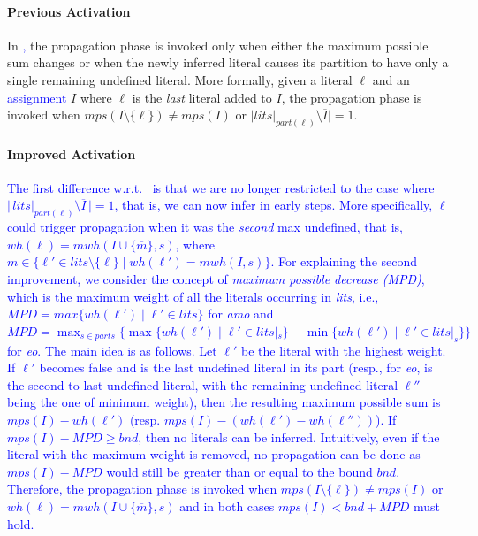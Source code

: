 \documentclass[preprint,authoryear]{elsarticle}
\newcommand{\lits}{\mathit{lits}}
\newcommand{\mwh}{\mathit{mwh}}
\newcommand{\wh}{\mathit{wh}}
\newcommand{\mps}{\mathit{mps}}
\newcommand{\parts}{\mathit{parts}}
\newcommand{\bnd}{\mathit{bnd}}
\theoremstyle{definition}
\begin{document}
\paragraph{Previous Activation}
In \textcolor{blue}{\cite{DBLP:conf/ijcai/AlvianoDFM24},} the propagation phase is invoked only when either the maximum possible sum changes or when the newly inferred literal causes its partition to have only a single remaining undefined literal.
More formally, given a literal $\ell$ and an \textcolor{blue}{assignment} $I$ where $\ell$ is the \textit{last} literal added to $I$, the propagation phase is invoked when $\mps(I \setminus \{\ell\}) \neq \mps(I)$ or $|\lits|_{\mathit{part}(\ell)} \setminus \overline{I}| = 1$.

\paragraph{Improved Activation}
\textcolor{blue}{
The first difference w.r.t.~\citep{DBLP:conf/ijcai/AlvianoDFM24} is that we are no longer restricted to the case where $\vert\,\lits|_{\mathit{part}(\ell)} \setminus \overline{I}\, \vert = 1$, that is, we can now infer in early steps.
More specifically, $\ell$ could trigger propagation when it was the \textit{second} max undefined, that is, $\wh(\ell) = \mwh(I \cup \{\overline{m}\}, s)$, where $m \in \{\ell' \in \lits \setminus \{\ell\} \mid \wh(\ell') = \mwh(I,s)\}.$ 
For explaining the second improvement, we consider the concept of \textit{maximum possible decrease (MPD)}, which is the maximum weight of all the literals occurring in \textit{lits}, i.e., $\mathit{MPD} = max\{\wh(\ell') \mid \ell' \in \lits\}$ for \textit{amo} and $\mathit{MPD} = \max_{s \in \parts}\{\max\{\wh(\ell') \mid \ell' \in \lits|_s\} -  \min\{\wh(\ell') \mid \ell' \in \lits|_s\}\}$ for \textit{eo}.
The main idea is as follows.
Let $\ell'$ be the literal with the highest weight. If $\ell'$ becomes false and is the last undefined literal in its part (resp., for \textit{eo}, is the second-to-last undefined literal, with the remaining undefined literal $\ell''$ being the one of minimum weight), then the resulting maximum possible sum is $\mps(I) - \wh(\ell')$ (resp. $\mps(I) - (\wh(\ell') - \wh(\ell''))$).
If $\mps(I) - \mathit{MPD} \ge \bnd$, then no literals can be inferred.
Intuitively, even if the literal with the maximum weight is removed, no propagation can be done as $\mps(I) - \mathit{MPD}$ would still be greater than or equal to the bound $\bnd$.
Therefore, the propagation phase is invoked when $\mps(I \setminus \{\ell\}) \neq \mps(I)$ or $\wh(\ell) = \mwh(I \cup \{\overline{m}\}, s)$ and in both cases $\mps(I) < \bnd + \mathit{MPD}$ must hold.}
\end{document}
